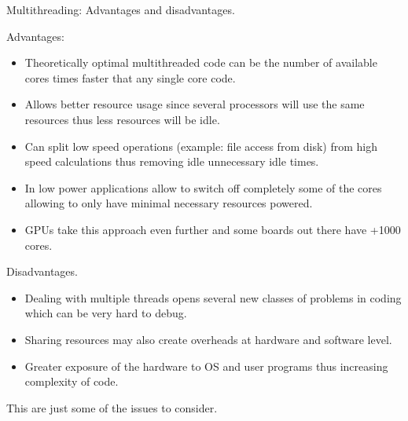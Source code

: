 \documentclass[8pt]{beamer}
\begin{document}
\begin{frame}{Multithreading: Advantages and disadvantages.}
 
\begin{block}{Advantages:}

\begin{itemize}
  \item Theoretically optimal multithreaded code can be the number of available cores times faster that any single core code.
  \item Allows better resource usage since several processors will use the same resources thus less resources will be idle.
  \item Can split low speed operations (example: file access from disk) from high speed calculations thus removing idle unnecessary idle times.
  \item In low power applications allow to switch off completely some of the cores allowing to only have minimal necessary resources powered.
  \item GPUs take this approach even further and some boards out there have +1000 cores.
\end{itemize}

\end{block}

\begin{block}{Disadvantages.}
 
\begin{itemize}
  \item Dealing with multiple threads opens several new classes of problems in coding which can be very hard to debug.
  \item Sharing resources may also create overheads at hardware and software level.
  \item Greater exposure of the hardware to OS and user programs thus increasing complexity of code.
\end{itemize}
 
\end{block}

\begin{center}
This are just some of the issues to consider.  
\end{center}

\end{frame}
\end{document}
